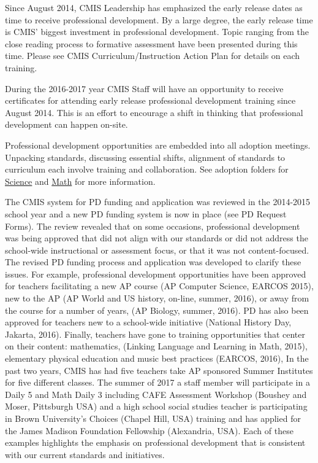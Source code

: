 \documentclass{report}
\begin{document}
\begin{findings}
Since August 2014, CMIS Leadership has emphasized the early release dates as time to receive professional development. By a large degree, the early release time is CMIS’ biggest investment in professional development. Topic ranging from the close reading process to formative assessment have been presented during this time. Please see CMIS Curriculum/Instruction Action Plan for details on each training. 

During the 2016-2017 year CMIS Staff will have an opportunity to receive certificates for attending early release professional development training since August 2014. This is an effort to encourage a shift in thinking that professional development can happen on-site. 


Professional development opportunities are embedded into all adoption meetings. Unpacking standards, discussing essential shifts, alignment of standards to curriculum each involve training and collaboration. See adoption folders for \href{https://drive.google.com/drive/folders/0ByVFfrm0zfoleXEyU3I0cTBXMVk?usp=sharing}{Science} and \href{https://drive.google.com/drive/folders/0ByVFfrm0zfolakRsUVNBaXhWcjQ?usp=sharing}{Math} for more information. 


The CMIS system for PD funding and application was reviewed in the 2014-2015 school year and a new PD funding system is now in place (see PD Request Forms). The review revealed that on some occasions, professional development was being approved that did not align with our standards or did not address the school-wide instructional or assessment focus, or that it was not content-focused. The revised PD funding process and application was developed to clarify these issues. For example, professional development opportunities have been approved for teachers facilitating a new AP course (AP Computer Science, EARCOS 2015), new to the AP (AP World and US history, on-line, summer, 2016), or away from the course for a number of years, (AP Biology, summer, 2016). PD has also been approved for teachers new to a school-wide initiative (National History Day, Jakarta, 2016). Finally, teachers have gone to training opportunities that center on their content: mathematics, (Linking Language and Learning in Math,  2015), elementary physical education and music best practices (EARCOS, 2016),  In the past two years, CMIS has had five teachers take AP sponsored Summer Institutes for five different classes. The summer of 2017 a staff member will participate in a Daily 5 and Math Daily 3 including CAFE Assessment Workshop (Boushey and Moser, Pittsburgh USA) and a high school social studies teacher is participating in Brown University’s Choices (Chapel Hill, USA) training and has applied for the James Madison Foundation Fellowship (Alexandria, USA).  Each of these examples highlights the emphasis on professional development that is consistent with our current standards and initiatives. 


\end{findings}
\end{document}
